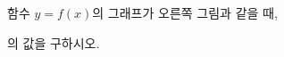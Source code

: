 \noindent\begin{minipage}[t]{0.58\linewidth}\vspace{0pt}\raggedright 함수 $y=f(x)$의 그래프가 오른쪽 그림과 같을 때,\par\smallskip\end{minipage}\hfill\begin{minipage}[t]{0.4\linewidth}\vspace{0pt}\centering \resizebox{\ifdim\width>\linewidth\linewidth\else\width\fi}{!}{}\end{minipage}\par
\noindent {}\par\smallskip\noindent 의 값을 구하시오.
